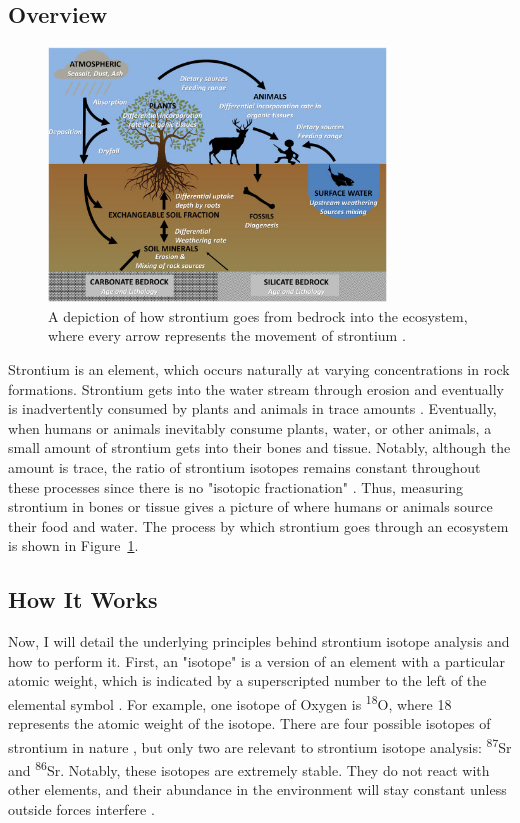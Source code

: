 \documentclass[a4paper, 12pt]{article}
\begin{document}
\subsection{Overview}
\begin{figure}[htbp]
    \centering
    \includegraphics[width=0.8\textwidth]{strontium_process.jpg}
    \caption{A depiction of how strontium goes from bedrock into the ecosystem, where every arrow
        represents the movement of strontium \citep{bataille2020}.}
    \label{fig:strontium_process}
\end{figure}

Strontium is an element, which occurs naturally at varying concentrations in rock formations.
Strontium gets into the water stream through erosion and eventually is inadvertently consumed by plants and animals in trace amounts \citep{bartelink2019}.
Eventually, when humans or animals inevitably consume plants, water, or other animals,
a small amount of strontium gets into their bones and tissue. Notably, although the amount is trace, the
ratio of strontium isotopes remains constant throughout these processes since there is no "isotopic fractionation" \citep{bartelink2019}.
Thus, measuring strontium in bones or tissue gives a picture of where humans or animals source their food and water.
The process by which strontium goes through an ecosystem is shown in Figure~\ref{fig:strontium_process}.

\subsection{How It Works}

Now, I will detail the underlying principles behind strontium isotope analysis
and how to perform it.
First, an "isotope" is a version of an element with a particular atomic weight,
which is indicated by a superscripted number to the left of the elemental symbol \citep{Meave60_2015}.
For example, one isotope of Oxygen is \textsuperscript{18}O, where 18 represents
the atomic weight of the isotope. There are four possible isotopes of strontium in
nature \citep{holt2021}, but only two are relevant to strontium isotope analysis: \textsuperscript{87}Sr and \textsuperscript{86}Sr.
Notably, these isotopes are extremely stable. They do not react with other elements,
and their abundance in the environment will stay constant unless outside forces interfere \citep{Long1998}.
\end{document}
